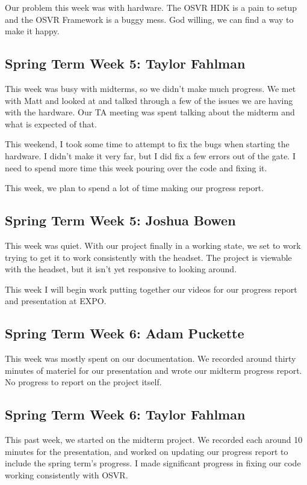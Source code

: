 \documentclass[draftclsnofoot,onecolumn]{IEEEtran}
\begin{document}
Our problem this week was with hardware. The OSVR HDK is a pain to setup and the OSVR Framework is a buggy mess. God willing, we can find a way to make it happy.

\subsection{Spring Term Week 5: Taylor Fahlman}

This week was busy with midterms, so we didn’t make much progress. We met with Matt and looked at and talked through a few of the issues we are having with the hardware. Our TA meeting was spent talking about the midterm and what is expected of that.

This weekend, I took some time to attempt to fix the bugs when starting the hardware. I didn’t make it very far, but I did fix a few errors out of the gate. I need to spend more time this week pouring over the code and fixing it.

This week, we plan to spend a lot of time making our progress report.

\subsection{Spring Term Week 5: Joshua Bowen}

This week was quiet. With our project finally in a working state, we set to work trying to get it to work consistently with the headset. The project is viewable with the headset, but it isn't yet responsive to looking around.

This week I will begin work putting together our videos for our progress report and presentation at EXPO.

\subsection{Spring Term Week 6: Adam Puckette}

This week was mostly spent on our documentation. We recorded around thirty minutes of materiel for our presentation and wrote our midterm progress report. No progress to report on the project itself.

\subsection{Spring Term Week 6: Taylor Fahlman}

This past week, we started on the midterm project. We recorded each around 10 minutes for the presentation, and worked on updating our progress report to include the spring term's progress. I made significant progress in fixing our code working consistently with OSVR.
\end{document}
